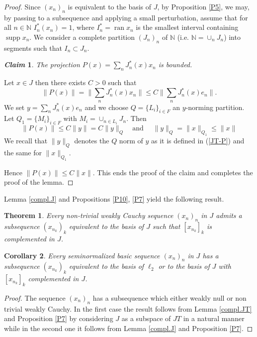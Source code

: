 \documentclass[12pt]{amsart}
\theoremstyle{plain}
\numberwithin{equation}{section}
\newcommand{\N}{\mathbb{N}}
\DeclareMathOperator{\supp}{supp}
\DeclareMathOperator{\ran}{ran}
\newtheorem{theorem}{Theorem}[section]
\newtheorem{corollary}[theorem]{Corollary}
\newtheorem*{claim}{\textit{Claim}}
\begin{document}
\begin{proof} Since $(x_n)_n$ is equivalent to the basis of $J$, by Proposition \ref{P5}, we may, by passing to a subsequence and applying a small perturbation, assume that for all $n\in \N$
$I_n^*(x_n) =1$, where $I_n^* = \ran x_n$ is the smallest interval containing $\supp x_n$. We consider a complete partition $(J_n)_n$ of $\N$
(i.e. $\N= \cup_n J_n$) into segments  such that $I_n\subset J_n$.
\begin{claim} The projection $ P(x) = \sum_n J_n^*(x) x_n$ is bounded.
\end{claim}
Let $x\in J$ then there exists $C> 0$ such that
\begin{equation}\label{eqn: eq 40}
 \|P(x)\|= \| \sum_n J_n^*(x) x_n\| \le C\| \sum_n J_n^*(x) e_n\|.
 \end{equation}
We set $y = \sum_n  J_n^*(x) e_n$ and we choose $Q=\{ L_i \}_{i\in F}$ an $y$-norming partition. Let $Q_1= \{ M_i \}_{i\in F}$ with $ M_i = \cup_{n\in {L_i} }J_n$. Then
\[\| P(x)\| \le C \| y\| = C \| y\|_Q \quad \text{and }\quad \|y \|_Q = \|x\|_{Q_1} \le \|x\| \]
We recall that $\| y \|_Q$ denotes the $Q$ norm of $y$  as it is defined in (\ref{JT-P}) and the same for
$\|x\|_{Q_1} $.

Hence $\|P(x)\| \le C \|x\|$.
 This  ends the proof of the claim and completes the proof of the lemma.
\end{proof}

Lemma \ref{compl.J} and Propositions \ref{P10},  \ref{P7} yield the following result.

\begin{theorem}\label{th:J-seq}
Every non-trivial weakly Cauchy sequence $(x_n)_n$ in $J$ admits a subsequence $(x_{n_k})_k$ equivalent to the basis of $J$ such that $[x_{n_k}]_k$ is complemented in $J$.
\end{theorem}

\begin{corollary}
Every seminormalized basic sequence $(x_n)_n$ in $J$ has a subsequence $(x_{n_k})_k$ equivalent to the basis of $\ell_2$ or to the basis of $J$ with $[x_{n_k}]_k$ complemented in $J$.
\end{corollary}
\begin{proof} The sequence $(x_n)_n$ has a subsequence which either weakly null or non trivial weakly Cauchy. In the first case the result follows from Lemma \ref{compl.JT} and Proposition
\ref{P7} by considering $J$ as a subspace of $JT$ in a natural manner while in the second one it follows from Lemma \ref{compl.J} and Proposition \ref{P7}.
\end{proof}
\end{document}

